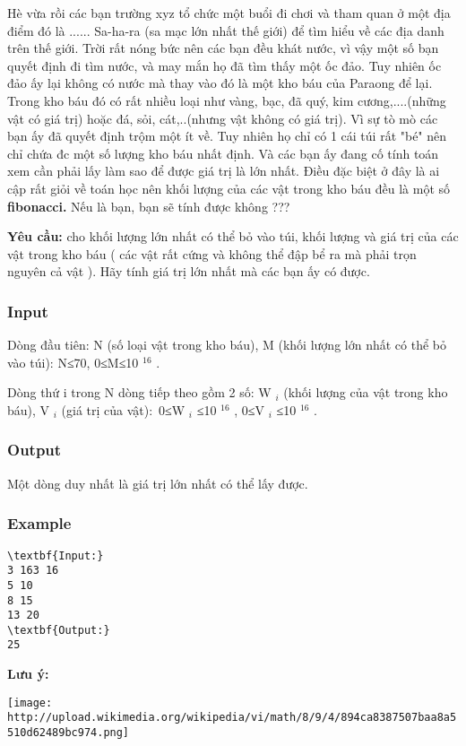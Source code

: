 

Hè vừa rồi các bạn trường xyz tổ chức một buổi đi chơi và tham quan ở một địa điểm đó là ...... Sa-ha-ra (sa mạc lớn nhất thế giới) để tìm hiểu về các địa danh trên thế giới. Trời rất nóng bức nên các bạn đều khát nước, vì vậy một số bạn quyết định đi tìm nước, và may mắn họ đã tìm thấy một ốc đảo. Tuy nhiên ốc đảo ấy lại không có nước mà thay vào đó là một kho báu của Paraong để lại. Trong kho báu đó có rất nhiều loại như vàng, bạc, đã quý, kim cương,....(những vật có giá trị) hoặc đá, sỏi, cát,..(nhưng vật không có giá trị). Vì sự tò mò các bạn ấy đã quyết định trộm một ít về. Tuy nhiên họ chỉ có 1 cái túi rất "bé" nên chỉ chứa đc một số lượng kho báu nhất định. Và các bạn ấy đang cố tính toán xem cần phải lấy làm sao để được giá trị là lớn nhất. Điều đặc biệt ở đây là ai cập rất giỏi về toán học nên khối lượng của các vật trong kho báu đều là một số \textbf{ fibonacci. } Nếu là bạn, bạn sẽ tính được không ???

\textbf{Yêu cầu: } cho khối lượng lớn nhất có thể bỏ vào túi, khối lượng và giá trị của các vật trong kho báu ( các vật rất cứng và không thể đập bể ra mà phải trọn nguyên cả vật ). Hãy tính giá trị lớn nhất mà các bạn ấy có được.

\subsubsection{Input}

Dòng đầu tiên: N (số loại vật trong kho báu), M (khối lượng lớn nhất có thể bỏ vào túi): N≤70, 0≤M≤10 $^ 16 $ .

Dòng thứ i trong N dòng tiếp theo gồm 2 số: W $_ i $ (khối lượng của vật trong kho báu), V $_ i $ (giá trị của vật): 0≤W $_ i $ ≤10 $^ 16 $ , 0≤V $_ i $ ≤10 $^ 16 $ .

\subsubsection{Output}

Một dòng duy nhất là giá trị lớn nhất có thể lấy được.

\subsubsection{Example}
\begin{verbatim}
\textbf{Input:}
3 163 16
5 10
8 15
13 20
\textbf{Output:}
25\end{verbatim}

\textbf{Lưu ý:}


\texttt{[image: http://upload.wikimedia.org/wikipedia/vi/math/8/9/4/894ca8387507baa8a5510d62489bc974.png]}